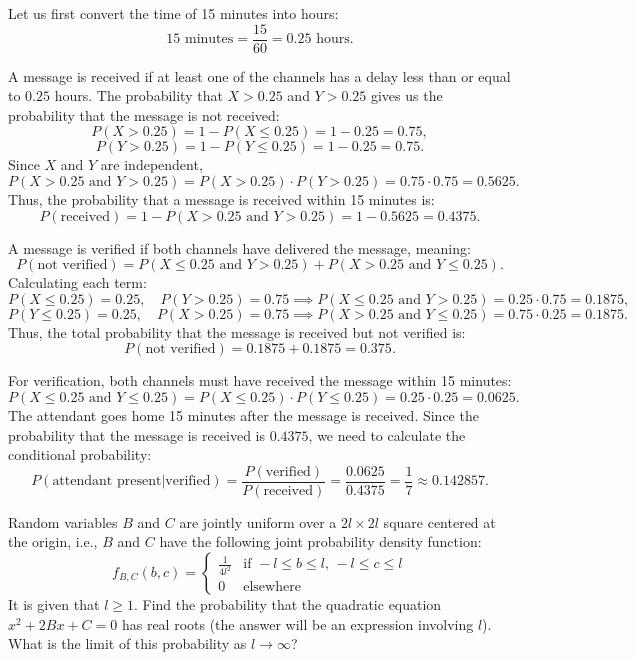 \begin{solution}
Let us first convert the time of 15 minutes into hours:
\[
15 \text{ minutes} = \frac{15}{60} = 0.25 \text{ hours}.
\]

A message is received if at least one of the channels has a delay less than or equal to \(0.25\) hours. The probability that \( X > 0.25 \) and \( Y > 0.25 \) gives us the probability that the message is not received:
\[
P(X > 0.25) = 1 - P(X \leq 0.25) = 1 - 0.25 = 0.75,
\]
\[
P(Y > 0.25) = 1 - P(Y \leq 0.25) = 1 - 0.25 = 0.75.
\]
Since \( X \) and \( Y \) are independent,
\[
P(X > 0.25 \text{ and } Y > 0.25) = P(X > 0.25) \cdot P(Y > 0.25) = 0.75 \cdot 0.75 = 0.5625.
\]
Thus, the probability that a message is received within 15 minutes is:
\[
P(\text{received}) = 1 - P(X > 0.25 \text{ and } Y > 0.25) = 1 - 0.5625 = 0.4375.
\]

A message is verified if both channels have delivered the message, meaning:
\[
P(\text{not verified}) = P(X \leq 0.25 \text{ and } Y > 0.25) + P(X > 0.25 \text{ and } Y \leq 0.25).
\]
Calculating each term:
\[
P(X \leq 0.25) = 0.25, \quad P(Y > 0.25) = 0.75 \implies P(X \leq 0.25 \text{ and } Y > 0.25) = 0.25 \cdot 0.75 = 0.1875,
\]
\[
P(Y \leq 0.25) = 0.25, \quad P(X > 0.25) = 0.75 \implies P(X > 0.25 \text{ and } Y \leq 0.25) = 0.75 \cdot 0.25 = 0.1875.
\]
Thus, the total probability that the message is received but not verified is:
\[
P(\text{not verified}) = 0.1875 + 0.1875 = 0.375.
\]

For verification, both channels must have received the message within 15 minutes:
\[
P(X \leq 0.25 \text{ and } Y \leq 0.25) = P(X \leq 0.25) \cdot P(Y \leq 0.25) = 0.25 \cdot 0.25 = 0.0625.
\]
The attendant goes home 15 minutes after the message is received. Since the probability that the message is received is \( 0.4375 \), we need to calculate the conditional probability:
\[
P(\text{attendant present} | \text{verified}) = \frac{P(\text{verified})}{P(\text{received})} = \frac{0.0625}{0.4375} = \frac{1}{7} \approx 0.142857.
\]
\end{solution}

\begin{exercise}
    Random variables \( B \) and \( C \) are jointly uniform over a \( 2l \times 2l \) square centered at the origin, i.e., \( B \) and \( C \) have the following joint probability density function:
    \[
    f_{B,C}(b, c) = 
    \begin{cases} 
    \frac{1}{4l^2} & \text{if } -l \leq b \leq l, \, -l \leq c \leq l \\ 
    0 & \text{elsewhere}
    \end{cases}
    \]
    It is given that \( l \geq 1 \). Find the probability that the quadratic equation \( x^2 + 2Bx + C = 0 \) has real roots (the answer will be an expression involving \( l \)). What is the limit of this probability as \( l \to \infty \)?
\end{exercise}

